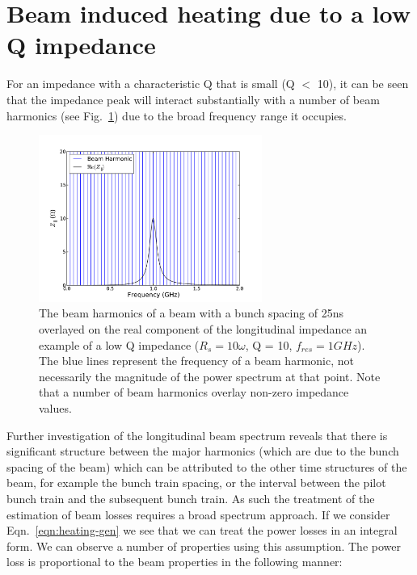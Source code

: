 \documentclass{cernyrep}
\begin{document}
\section{Beam induced heating due to a low Q impedance}

For an impedance with a characteristic Q that is small (Q $<$ 10), it can be seen that the impedance peak will interact substantially with a number of beam harmonics (see Fig.~\ref{fig:low_q_harmonics}) due to the broad frequency range it occupies.

\begin{figure}
\begin{center}
\includegraphics[width=0.65\textwidth]{figures/low_q_10_resonance_beam_harmonics.pdf}
\end{center}
\caption{The beam harmonics of a beam with a bunch spacing of 25ns overlayed on the real component of the longitudinal impedance an example of a low Q impedance ($R_{s}=10\omega$, Q = 10, $f_{res}=1GHz$). The blue lines represent the frequency of a beam harmonic, not necessarily the magnitude of the power spectrum at that point. Note that a number of beam harmonics overlay non-zero impedance values.}
\label{fig:low_q_harmonics}
\end{figure}

Further investigation of the longitudinal beam spectrum reveals that there is significant structure between the major harmonics (which are due to the bunch spacing of the beam) which can be attributed to the other time structures of the beam, for example the bunch train spacing, or the interval between the pilot bunch train and the subsequent bunch train. As such the treatment of the estimation of beam losses requires a broad spectrum approach. If we consider Eqn.~\ref{eqn:heating-gen} we see that we can treat the power losses in an integral form. We can observe a number of properties using this assumption. The power loss is proportional to the beam properties in the following manner:
\end{document}
